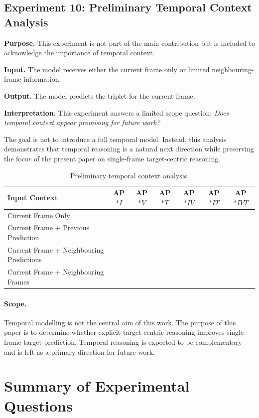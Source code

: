 \documentclass[11pt]{article}
\begin{document}
\subsection{Experiment 10: Preliminary Temporal Context Analysis}

\textbf{Purpose.}
This experiment is not part of the main contribution but is included to acknowledge the importance of temporal context.

\textbf{Input.}
The model receives either the current frame only or limited neighbouring-frame information.

\textbf{Output.}
The model predicts the triplet for the current frame.

\textbf{Interpretation.}
This experiment answers a limited scope question: \emph{Does temporal context appear promising for future work?}

The goal is not to introduce a full temporal model. Instead, this analysis demonstrates that temporal reasoning is a natural next direction while preserving the focus of the present paper on single-frame target-centric reasoning.

\begin{table}[H]
\centering
\caption{Preliminary temporal context analysis.}
\begin{tabular}{lcccccc}
\toprule
Input Context & AP$*I$ & AP$*V$ & AP$*T$ & AP$*{IV}$ & AP$*{IT}$ & AP$*{IVT}$ \\
\midrule
Current Frame Only & & & & & & \\
Current Frame + Previous Prediction & & & & & & \\
Current Frame + Neighbouring Predictions & & & & & & \\
Current Frame + Neighbouring Frames & & & & & & \\
\bottomrule
\end{tabular}
\label{tab:temporal_preliminary}
\end{table}

\paragraph{Scope.}
Temporal modelling is not the central aim of this work. The purpose of this paper is to determine whether explicit target-centric reasoning improves single-frame target prediction. Temporal reasoning is expected to be complementary and is left as a primary direction for future work.

\section{Summary of Experimental Questions}
\end{document}
